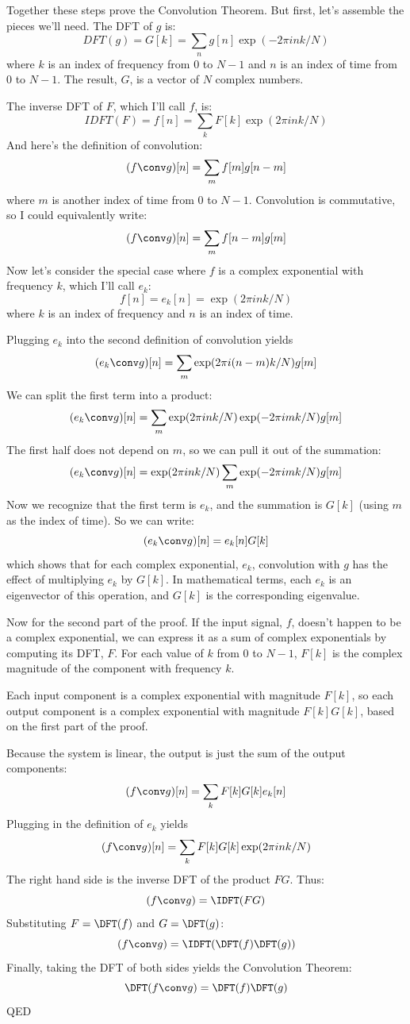 \documentclass[12pt]{book}
\begin{document}
Together these steps prove the Convolution Theorem.  But first, let's
assemble the pieces we'll need.  The DFT of $g$ is:
%
\[ DFT(g) = G[k] = \sum_n g[n] \exp(-2 \pi i n k / N) \]
%
where $k$ is an index of frequency from
0 to $N-1$ and $n$ is an index of time from 0 to $N-1$.
The result, $G$, is a vector of $N$ complex numbers.

The inverse DFT of $F$, which I'll call $f$, is:
%
\[ IDFT(F) = f[n] = \sum_k F[k] \exp(2 \pi i n k / N) \]
%
And here's the definition of convolution:
%
\[ (f \conv g)[n] = \sum_m f[m] g[n-m] \]
%
where $m$ is another index of time from 0 to $N-1$.
Convolution is commutative, so I could equivalently write:
%
\[ (f \conv g)[n] = \sum_m f[n-m] g[m] \]
%
Now let's consider the special case where $f$ is a complex
exponential with frequency $k$, which I'll call $e_k$:
%
\[ f[n] = e_k[n] = \exp(2 \pi i n k / N) \]
%
where $k$ is an index of frequency and $n$ is an index of time.

Plugging $e_k$ into the second definition of convolution yields
%
\[ (e_k \conv g)[n] = \sum_m \exp(2 \pi i (n-m) k / N) g[m]  \]
%
We can split the first term into a product:
%
\[ (e_k \conv g)[n] = \sum_m \exp(2 \pi i n k / N) \exp(-2 \pi i m k / N) g[m]  \]
%
The first half does not depend on $m$, so we can pull it out of the
summation:
%
\[ (e_k \conv g)[n] = \exp(2 \pi i n k / N) \sum_m \exp(-2 \pi i m k / N) g[m]  \]
%
Now we recognize that the first term is $e_k$, and the summation is
$G[k]$ (using $m$ as the index of time).  So we can write:
%
\[ (e_k \conv g)[n] = e_k[n] G[k] \]
%
which shows that for each complex exponential, $e_k$, convolution
with $g$ has the effect of multiplying $e_k$ by $G[k]$.  In mathematical
terms, each $e_k$ is an eigenvector of this operation, and
$G[k]$ is the corresponding eigenvalue.

Now for the second part of the proof.  If the input signal, $f$, doesn't
happen to be a complex exponential, we can express it as a sum of
complex exponentials by computing its DFT, $F$.
For each value of $k$ from 0 to $N-1$, $F[k]$ is the complex
magnitude of the component with frequency $k$.

Each input component is a complex exponential with magnitude
$F[k]$, so each output component is a complex
exponential with magnitude $F[k]G[k]$, based on the first part of
the proof.

Because the system is linear, the output is just the sum of the
output components:
%
\[ (f \conv g)[n] = \sum_k F[k] G[k] e_k[n] \]
%
Plugging in the definition of $e_k$ yields
%
\[ (f \conv g)[n] = \sum_k F[k] G[k] \exp(2 \pi i n k / N) \]
%
The right hand side is the inverse DFT of the product $F G$.  Thus:
%
\[ (f \conv g) = \IDFT( F G ) \]
%
Substituting $F = \DFT(f)$ and $G = \DFT(g)$:
%
\[ (f \conv g) = \IDFT( \DFT(f) \DFT(g) ) \]
%
Finally, taking the DFT of both sides yields the Convolution Theorem:
%
\[ \DFT(f \conv g) = \DFT(f) \DFT(g) \]
%
QED
\end{document}
